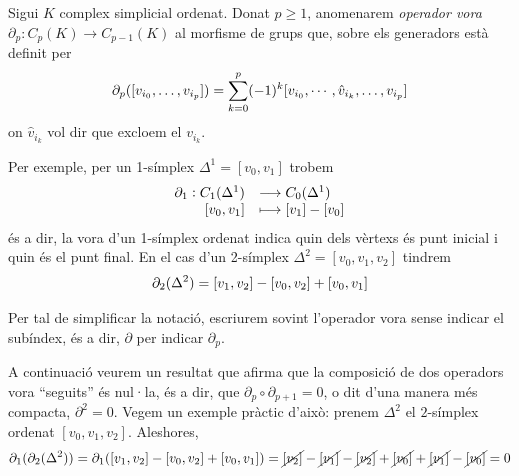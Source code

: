 \documentclass[../main.tex]{subfiles}
\begin{document}
\begin{defi}
Sigui $K$ complex simplicial ordenat. Donat $p\geq 1$, anomenarem \textit{operador vora} $\partial_p:C_p(K)\rightarrow C_{p-1}(K)$ al morfisme de grups que, sobre els generadors està definit per 
\begin{equation}
    \notag
    \partial_p([v_{i_0},\ldots,v_{i_p}]) = \sum_{k=0}^p(-1)^k[v_{i_0},\cdots,\hat{v}_{i_k},\ldots,v_{i_p}]
\end{equation}
on $\hat{v}_{i_k}$ vol dir que excloem el $v_{i_k}$.
\end{defi}

\begin{ej}
Per exemple, per un 1-símplex $\Delta^1 = [v_0,v_1]$ trobem
\begin{equation}
    \notag
    \begin{array}{rl}
        \partial_1:C_1(\Delta^1) & \longrightarrow C_0(\Delta^1) \\
        \left[v_0,v_1\right] & \longmapsto \left[v_1\right]-\left[v_0\right]
    \end{array}
\end{equation}
és a dir, la vora d'un 1-símplex ordenat indica quin dels vèrtexs és punt inicial i quin és el punt final. En el cas d'un 2-símplex $\Delta^2 = [v_0,v_1,v_2]$ tindrem
\begin{equation}
    \notag
    \partial_2(\Delta^2) = [v_1,v_2]-[v_0,v_2]+[v_0,v_1]
\end{equation}
\end{ej}

Per tal de simplificar la notació, escriurem sovint l'operador vora sense indicar el subíndex, és a dir, $\partial$ per indicar $\partial_p$.

A continuació veurem un resultat que afirma que la composició de dos operadors vora ``seguits'' és nul·la, és a dir, que $\partial_p\circ\partial_{p+1} = 0$, o dit d'una manera més compacta, $\partial^2 = 0$. Vegem un exemple pràctic d'això: prenem $\Delta^2$ el $2$-símplex ordenat $[v_0,v_1,v_2]$. Aleshores,
\begin{equation}
    \notag
    \partial_1(\partial_2(\Delta^2)) = \partial_1([v_1,v_2]-[v_0,v_2]+[v_0,v_1]) = \cancel{[v_2]}-\cancel{[v_1]}-\cancel{[v_2]}+\cancel{[v_0]}+\cancel{[v_1]}-\cancel{[v_0]} = 0
\end{equation}
\end{document}

